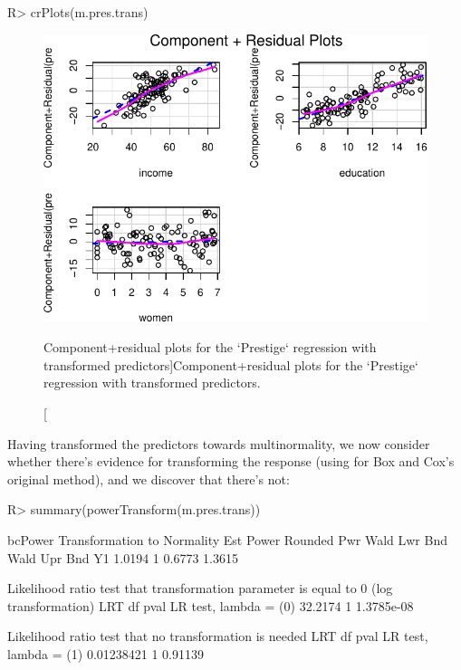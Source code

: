 \documentclass[
]{jss}
\begin{document}
\begin{CodeChunk}
\begin{CodeInput}
R> crPlots(m.pres.trans)
\end{CodeInput}
\begin{figure}

{\centering \includegraphics{JSS-article_files/figure-latex/CR-plots-transformed-1} 

}

\caption[Component+residual plots for the `Prestige` regression with transformed predictors]{Component+residual plots for the `Prestige` regression with transformed predictors.}\label{fig:CR-plots-transformed}
\end{figure}
\end{CodeChunk}

Having transformed the predictors towards multinormality, we now
consider whether there's evidence for transforming the response (using
 for Box and Cox's original method), and we
discover that there's not:

\begin{CodeChunk}
\begin{CodeInput}
R> summary(powerTransform(m.pres.trans))
\end{CodeInput}
\begin{CodeOutput}
bcPower Transformation to Normality 
   Est Power Rounded Pwr Wald Lwr Bnd Wald Upr Bnd
Y1    1.0194           1       0.6773       1.3615

Likelihood ratio test that transformation parameter is equal to 0
 (log transformation)
                          LRT df       pval
LR test, lambda = (0) 32.2174  1 1.3785e-08

Likelihood ratio test that no transformation is needed
                             LRT df    pval
LR test, lambda = (1) 0.01238421  1 0.91139
\end{CodeOutput}
\end{CodeChunk}
\end{document}

